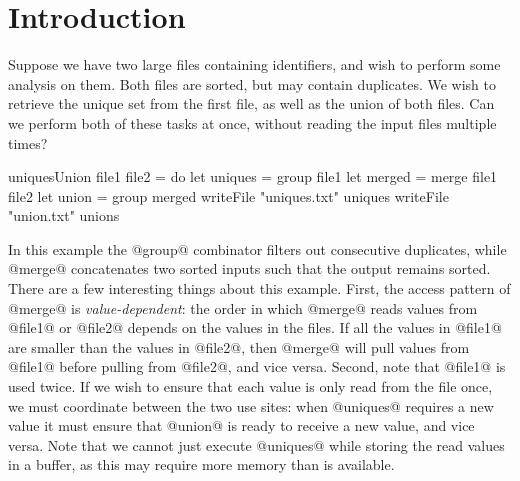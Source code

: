 \section{Introduction}
\label{s:Introduction}


Suppose we have two large files containing identifiers, and wish to perform some analysis on them.
Both files are sorted, but may contain duplicates.
We wish to retrieve the unique set from the first file, as well as the union of both files.
Can we perform both of these tasks at once, without reading the input files multiple times?
\begin{code}
uniquesUnion file1 file2
 = do   let uniques = group file1
        let merged  = merge file1 file2
        let union   = group merged
        writeFile "uniques.txt" uniques
        writeFile "union.txt"   unions
\end{code}


In this example the @group@ combinator filters out consecutive duplicates, while @merge@ concatenates two sorted inputs such that the output remains sorted.
There are a few interesting things about this example.
First, the access pattern of @merge@ is \emph{value-dependent}: the order in which @merge@ reads values from @file1@ or @file2@ depends on the values in the files.
If all the values in @file1@ are smaller than the values in @file2@, then @merge@ will pull values from @file1@ before pulling from @file2@, and vice versa.
Second, note that @file1@ is used twice.
If we wish to ensure that each value is only read from the file once, we must coordinate between the two use sites: when @uniques@ requires a new value it must ensure that @union@ is ready to receive a new value, and vice versa.
Note that we cannot just execute @uniques@ while storing the read values in a buffer, as this may require more memory than is available.

